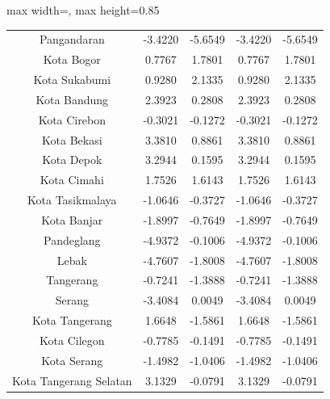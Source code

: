 \begin{table}[H]
\begin{adjustbox}{max width=\textwidth, max height=0.85\textheight}
\begin{tabular}{|c|c|c|c|c|}
Pangandaran & -3.4220 & -5.6549 & -3.4220 & -5.6549 \\
Kota Bogor & 0.7767 & 1.7801 & 0.7767 & 1.7801 \\
Kota Sukabumi & 0.9280 & 2.1335 & 0.9280 & 2.1335 \\
Kota Bandung & 2.3923 & 0.2808 & 2.3923 & 0.2808 \\
Kota Cirebon & -0.3021 & -0.1272 & -0.3021 & -0.1272 \\
Kota Bekasi & 3.3810 & 0.8861 & 3.3810 & 0.8861 \\
Kota Depok & 3.2944 & 0.1595 & 3.2944 & 0.1595 \\
Kota Cimahi & 1.7526 & 1.6143 & 1.7526 & 1.6143 \\
Kota Tasikmalaya & -1.0646 & -0.3727 & -1.0646 & -0.3727 \\
Kota Banjar & -1.8997 & -0.7649 & -1.8997 & -0.7649 \\
Pandeglang & -4.9372 & -0.1006 & -4.9372 & -0.1006 \\
Lebak & -4.7607 & -1.8008 & -4.7607 & -1.8008 \\
Tangerang & -0.7241 & -1.3888 & -0.7241 & -1.3888 \\
Serang & -3.4084 & 0.0049 & -3.4084 & 0.0049 \\
Kota Tangerang & 1.6648 & -1.5861 & 1.6648 & -1.5861 \\
Kota Cilegon & -0.7785 & -0.1491 & -0.7785 & -0.1491 \\
Kota Serang & -1.4982 & -1.0406 & -1.4982 & -1.0406 \\
Kota Tangerang Selatan & 3.1329 & -0.0791 & 3.1329 & -0.0791 \\
\hline
\end{tabular}
\end{adjustbox}
\end{table}